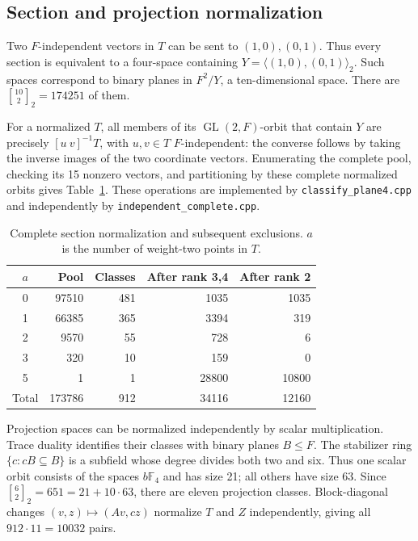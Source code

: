 \documentclass[12pt,letterpaper,onecolumn]{article}
\newcommand{\F}{\mathbb F}
\newcommand{\GL}{\operatorname{GL}}
\theoremstyle{definition}
\begin{document}
\subsection{Section and projection normalization}
Two $F$-independent vectors in $T$ can be sent to $(1,0),(0,1)$. Thus every section is equivalent to a four-space containing $Y=\langle(1,0),(0,1)\rangle_2$. Such spaces correspond to binary planes in $F^2/Y$, a ten-dimensional space. There are ${10\brack2}_2=174251$ of them.

For a normalized $T$, all members of its $\GL(2,F)$-orbit that contain $Y$ are precisely $[u\ v]^{-1}T$, with $u,v\in T$ $F$-independent: the converse follows by taking the inverse images of the two coordinate vectors. Enumerating the complete pool, checking its 15 nonzero vectors, and partitioning by these complete normalized orbits gives Table~\ref{tab:classification}. These operations are implemented by \texttt{classify\_plane4.cpp} and independently by \texttt{independent\_complete.cpp}.

\begin{table}[t]
\centering
\caption{Complete section normalization and subsequent exclusions. $a$ is the number of weight-two points in $T$.}
\label{tab:classification}
\begin{tabular}{@{}crrrr@{}}
\toprule
$a$ & Pool & Classes & After rank 3,4 & After rank 2\\
\midrule
0 & 97510 & 481 & 1035 & 1035\\
1 & 66385 & 365 & 3394 & 319\\
2 & 9570 & 55 & 728 & 6\\
3 & 320 & 10 & 159 & 0\\
5 & 1 & 1 & 28800 & 10800\\
\midrule
Total & 173786 & 912 & 34116 & 12160\\
\bottomrule
\end{tabular}
\end{table}

Projection spaces can be normalized independently by scalar multiplication. Trace duality identifies their classes with binary planes $B\le F$. The stabilizer ring $\{c:cB\subseteq B\}$ is a subfield whose degree divides both two and six. Thus one scalar orbit consists of the spaces $b\F_4$ and has size 21; all others have size 63. Since ${6\brack2}_2=651=21+10\cdot63$, there are eleven projection classes. Block-diagonal changes $(v,z)\mapsto(Av,cz)$ normalize $T$ and $Z$ independently, giving all $912\cdot11=10032$ pairs.
\end{document}
